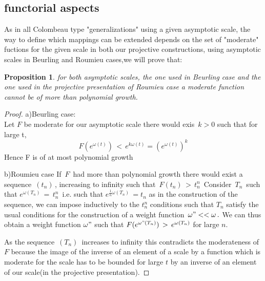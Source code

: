 \documentclass[12pt,a4paper]{amsart}
\newtheorem{proposition}[theorem]{Proposition}
\begin{document}
 \subsection{functorial aspects}
 
 As in all Colombeau type "generalizations" using a given 
 asymptotic scale, the way to define which mappings can be
 extended depends on the set of "moderate" fuctions for the given scale 
 in both our projective constructions, using asymptotic scales in 
  Beurling and Roumieu cases,we will prove that:
  \begin{proposition}
 for both asymptotic scales, the one used in Beurling case and the one used in the projective presentation of Roumieu case a moderate function cannot be of more than polynomial growth.
  \end{proposition}
   
  
  \begin{proof} 
a)Beurling case:
\\
 

Let $F$ be moderate for our asymptotic scale 
there would exis $\,k>0$
such that for large t,
 $$\,F(e^{\omega(t)})\,<\,e^{k\omega(t)} = (e^{\omega(t)})^k\,$$ Hence F is of at most polynomial growth

b)Roumieu case 
If $\,F\,$ had more than polynomial growth there would exist a sequence $\,(t_n)\,$, increasing to infinity 
such that 
$\,F(t_n)\,>\,t_n^n\,$
Consider $\,T_n\,$ such that
 $e^{\omega(T_n)}\,=\,t_n^n\,$ i.e. such that 
 $e^{\frac{1}{n}\omega(T_n)} \,= t_n$
 as in the construction of the sequence, we can impose inductively to the $t_n^n$ conditions such that $T_n$ satisfy the usual conditions for the construction of a weight function $\,\omega"<<\omega\,.$
 We can thus obtain a weight function $\omega"$ such that 
 $F(e^{\omega"(T_n)})\,>\,e^{\omega(T_n)}$ for large $n$.
 
 As the sequence $\,(T_n)\,$
 increases to infinity this contradicts the moderateness of $F$ because the image of the inverse of an element of a scale by a function which is moderate for the scale has to be bounded for large $t$ by an inverse of an element of our scale(in the projective presentation).  
 \end{proof}
 
\end{document}
